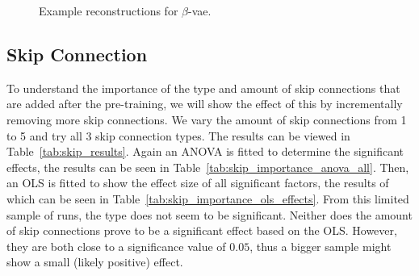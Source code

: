 \begin{figure}[!ht]
    \centering
    \caption{Example reconstructions for $\beta$-vae.}
    \label{fig:beta-vae-recon-examples}
     \quad
\end{figure}


\subsection{Skip Connection}
To understand the importance of the type and amount of skip connections that are added after the pre-training, we will show the effect of this by incrementally removing more skip connections. We vary the amount of skip connections from 1 to 5 and try all 3 skip connection types. The results can be viewed in Table~\ref{tab:skip_results}.
Again an ANOVA is fitted to determine the significant effects, the results can be seen in Table~\ref{tab:skip_importance_anova_all}. Then, an OLS is fitted to show the effect size of all significant factors, the results of which can be seen in Table~\ref{tab:skip_importance_ols_effects}. From this limited sample of runs, the type does not seem to be significant. Neither does the amount of skip connections prove to be a significant effect based on the OLS. However, they are both close to a significance value of $0.05$, thus a bigger sample might show a small (likely positive) effect.





